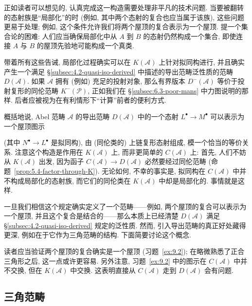 正如读者可以想见的, 认真完成这一构造需要处理非平凡的技术问题. 当要被翻转的态射族是“局部化”的时 (例如, 其中两个态射的复合也应当属于该族), 这些问题更易于处理; 例如, 这个条件允许我们将两个屋顶的复合表示为一个屋顶. 提一个集合论的困难: 人们应当确保局部化中从 $A$ 到 $B$ 的态射仍然构成一个集合, 即使连接 $A$ 与 $B$ 的屋顶先验地可能构成一个真类.

带着所有这些告诫, 局部化过程确实可以在 $K(\mathcal{A})$ 上针对拟同构进行, 并且确实产生一个满足 \S\ref{subsec:4.2-quasi-iso-derived} 中描述的导出范畴泛性质的范畴 $D(\mathcal{A})$. 如果 $\mathcal{A}$ 拥有 (例如) 充足的投射对象, 那么有界版本 $D^-(\mathcal{A})$ 等价于投射复形的同伦范畴 $K^-(\mathcal{P})$, 正如我们在 \S\ref{subsec:6.3-poor-mans} 中力图说明的那样. 后者应被视为在有利情形下“计算”前者的便利方式.

概括地说, Abel 范畴 $\mathcal{A}$ 的导出范畴 $D(\mathcal{A})$ 中的一个态射 $L^\bullet \to M^\bullet$ 可以表示为一个屋顶图示
\begin{center}
\end{center}
(其中 $N^\bullet\to L^\bullet$ 是拟同构), 由 (同伦类的) 上链复形态射组成, 模一个恰当的等价关系. 注意这个构造是作用在 $K(\mathcal{A})$ 上, 而非更简单的 $C(\mathcal{A})$ 上: 首先, 人们不妨从 $K(\mathcal{A})$ 出发, 因为函子 $C(\mathcal{A})\to D(\mathcal{A})$ 必然要经过同伦范畴 (命题~\ref{prop:5.4-factor-through-K}). 无论如何, 不幸的事实是, 拟同构在 $C(\mathcal{A})$ 中并不构成局部化的态射族, 而它们的同伦类在 $K(\mathcal{A})$ 中却是局部化的. 事情就是这样.

一旦我们相信这个规定确实定义了一个范畴——例如, 两个屋顶的复合可以表示为一个屋顶, 并且这个复合是结合的——那么本质上已经清楚 $D(\mathcal{A})$ 满足 \S\ref{subsec:4.2-quasi-iso-derived} 规定的泛性质. 然而, 引入导出范畴的真正好处藏得更深, 例如在于它作为三角范畴的结构. 下面简要讨论这个概念.

读者应当验证两个屋顶的复合确实是一个屋顶 (习题~\ref{ex:9.2}); 在略微熟悉了正合三角形之后, 这一点或许更容易. 另外注意, 习题~\ref{ex:9.2} 中的图示在 $C(\mathcal{A})$ 中并不交换, 但在 $K(\mathcal{A})$ 中交换. 这表明直接从 $C(\mathcal{A})$ 走到 $D(\mathcal{A})$ 会有问题.

\subsection{三角范畴}\label{subsec:9.2-triangulated}

